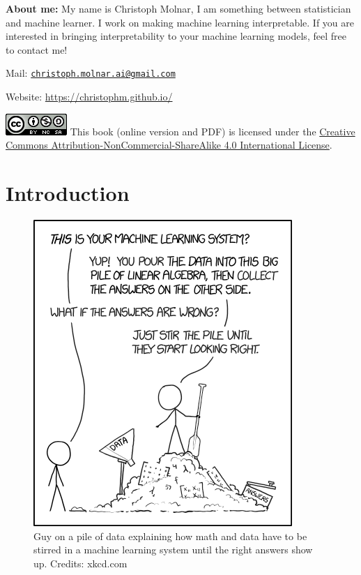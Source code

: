 \documentclass[12pt,]{krantz}
\theoremstyle{definition}
\theoremstyle{definition}
\theoremstyle{definition}
\theoremstyle{remark}
\begin{document}
\textbf{About me:} My name is Christoph Molnar, I am something between
statistician and machine learner. I work on making machine learning
interpretable. If you are interested in bringing interpretability to
your machine learning models, feel free to contact me!

Mail:
\href{mailto:christoph.molnar.ai@gmail.com}{\nolinkurl{christoph.molnar.ai@gmail.com}}

Website: \url{https://christophm.github.io/}

\includegraphics{images/by-nc-sa.png} This book (online version and PDF)
is licensed under the
\href{http://creativecommons.org/licenses/by-nc-sa/4.0/}{Creative
Commons Attribution-NonCommercial-ShareAlike 4.0 International License}.

\mainmatter

\chapter{Introduction}\label{intro}

\begin{figure}
\centering
\includegraphics{images/machine-learning-xkcd.png}
\caption{Guy on a pile of data explaining how math and data have to be
stirred in a machine learning system until the right answers show up.
Credits: xkcd.com}
\end{figure}
\end{document}
